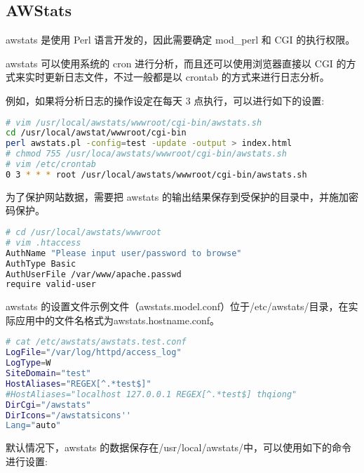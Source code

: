 \subsection{AWStats}


awstats 是使用 Perl 语言开发的，因此需要确定 mod\_perl 和 CGI 的执行权限。


awstats 可以使用系统的 cron 进行分析，而且还可以使用浏览器直接以 CGI 的方式来实时更新日志文件，不过一般都是以 crontab 的方式来进行日志分析。

例如，如果将分析日志的操作设定在每天 3 点执行，可以进行如下的设置:


\begin{lstlisting}[language=bash]
# vim /usr/local/awstats/wwwroot/cgi-bin/awstats.sh
cd /usr/local/awstat/wwwroot/cgi-bin
perl awstats.pl -config=test -update -output > index.html
# chmod 755 /usr/loca/awstats/wwwroot/cgi-bin/awstats.sh
# vim /etc/crontab
0 3 * * * root /usr/local/awstats/wwwroot/cgi-bin/awstats.sh
\end{lstlisting}



为了保护网站数据，需要把 awstats 的输出结果保存到受保护的目录中，并施加密码保护。




\begin{lstlisting}[language=bash]
# cd /usr/local/awstats/wwwroot
# vim .htaccess
AuthName "Please input user/password to browse"
AuthType Basic
AuthUserFile /var/www/apache.passwd
require valid-user
\end{lstlisting}


awstats 的设置文件示例文件（awstats.model.conf）位于/etc/awstats/目录，在实际应用中的文件名格式为awstats.hostname.conf。







\begin{lstlisting}[language=bash]
# cat /etc/awstats/awstats.test.conf
LogFile="/var/log/httpd/access_log"
LogType=W
SiteDomain="test"
HostAliases="REGEX[^.*test$]"
#HostAliases="localhost 127.0.0.1 REGEX[^.*test$] thqiong"
DirCgi="/awstats"
DirIcons="/awstatsicons''
Lang="auto"
\end{lstlisting}


默认情况下，awstats 的数据保存在/usr/local/awstats/中，可以使用如下的命令进行设置:



